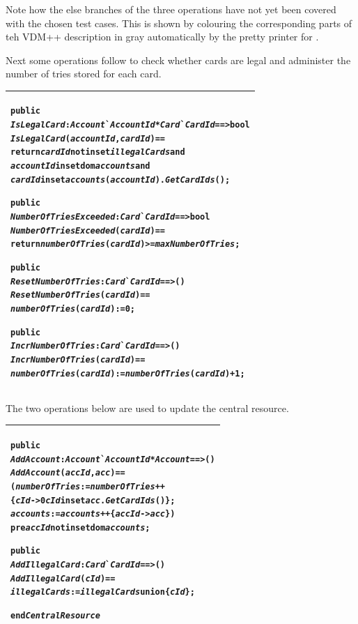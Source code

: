 \documentclass[\pformat,12pt,twoside]{article}
\newenvironment{VDMgray}%
{\begin{tabular}{|G|}\hline\small\begin{alltt}}%
{\end{alltt}\normalsize\\
 \hline\end{tabular}}
\begin{document}
Note how the else branches of the three operations have not yet been
covered with the chosen test cases. This is shown by colouring the
corresponding parts of teh VDM++ description in gray automatically by
the pretty printer for \vdmtools. 

Next some operations follow to check whether cards are legal 
and administer the number of tries stored for each card. 

\begin{VDMgray}
 \textbf{public}
 \textit{IsLegalCard} : \textit{Account}\`{}\textit{AccountId} * \textit{Card}\`{}\textit{CardId} ==\texttt{>} \textbf{bool}
 \textit{IsLegalCard}(\textit{accountId},\textit{cardId}) ==
   \textbf{return} \textit{cardId} \textbf{not in set} \textit{illegalCards} \textbf{and}
          \textit{accountId} \textbf{in set} \textbf{dom} \textit{accounts} \textbf{and}
          \textit{cardId} \textbf{in set} \textit{accounts}(\textit{accountId}).\textit{GetCardIds}();

 \textbf{public}
 \textit{NumberOfTriesExceeded} : \textit{Card}\`{}\textit{CardId} ==\texttt{>} \textbf{bool}
 \textit{NumberOfTriesExceeded}(\textit{cardId}) ==
   \textbf{return} \textit{numberOfTries}(\textit{cardId}) \texttt{>}= \textit{maxNumberOfTries};

 \textbf{public}
 \textit{ResetNumberOfTries} : \textit{Card}\`{}\textit{CardId} ==\texttt{>} ()
 \textit{ResetNumberOfTries}(\textit{cardId}) ==
   \textit{numberOfTries}(\textit{cardId}) := 0;

 \textbf{public}
 \textit{IncrNumberOfTries} : \textit{Card}\`{}\textit{CardId} ==\texttt{>} ()
 \textit{IncrNumberOfTries}(\textit{cardId}) ==
   \textit{numberOfTries}(\textit{cardId}) := \textit{numberOfTries}(\textit{cardId}) + 1;
\end{VDMgray}


The two operations below are used to update the central resource. 


\begin{VDMgray}
 \textbf{public}
 \textit{AddAccount} : \textit{Account}\`{}\textit{AccountId} * \textit{Account} ==\texttt{>} ()
 \textit{AddAccount}(\textit{accId},\textit{acc}) ==
   (\textit{numberOfTries} := \textit{numberOfTries} ++
                     \{\textit{cId} {\textbar}-\texttt{>} 0 {\textbar} \textit{cId} \textbf{in set} \textit{acc}.\textit{GetCardIds}()\};
    \textit{accounts} := \textit{accounts} ++ \{\textit{accId} {\textbar}-\texttt{>} \textit{acc}\})
 \textbf{pre} \textit{accId} \textbf{not in set} \textbf{dom} \textit{accounts};

 \textbf{public}
 \textit{AddIllegalCard} : \textit{Card}\`{}\textit{CardId} ==\texttt{>} ()
 \textit{AddIllegalCard}(\textit{cId}) ==
   \textit{illegalCards} := \textit{illegalCards} \textbf{union} \{\textit{cId}\};

\textbf{end} \textit{CentralResource}
\end{VDMgray}
\end{document}
